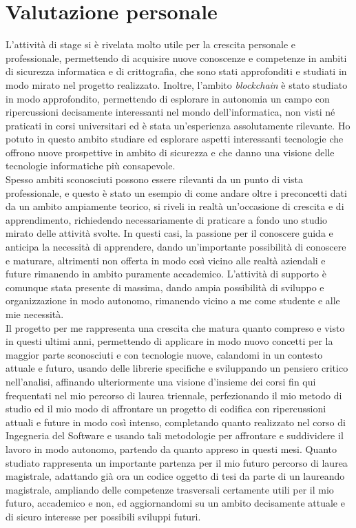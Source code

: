 \section{Valutazione personale}\label{sec:conclusioni-valutazione}

L'attività di stage si è rivelata molto utile per la crescita personale e professionale, permettendo di acquisire nuove conoscenze
e competenze in ambiti di sicurezza informatica e di crittografia, che sono stati approfonditi e studiati in modo mirato nel progetto realizzato.
Inoltre, l'ambito \textit{blockchain} è stato studiato in modo approfondito, permettendo di esplorare in autonomia un campo con ripercussioni
decisamente interessanti nel mondo dell'informatica, non visti né praticati in corsi universitari ed è stata un'esperienza assolutamente rilevante. 
Ho potuto in questo ambito studiare ed esplorare aspetti interessanti tecnologie che offrono nuove prospettive in ambito di sicurezza e che danno una visione delle tecnologie informatiche più consapevole. \\

Spesso ambiti sconosciuti possono essere rilevanti da un punto di vista professionale, e questo è stato un esempio di come
andare oltre i preconcetti dati da un ambito ampiamente teorico, si riveli in realtà un'occasione di crescita
e di apprendimento, richiedendo necessariamente di praticare a fondo uno studio mirato delle attività svolte. 
In questi casi, la passione per il conoscere guida e anticipa la necessità di apprendere, dando un'importante possibilità di conoscere e maturare,
altrimenti non offerta in modo così vicino alle realtà aziendali e future rimanendo in ambito puramente accademico.
L'attività di supporto è comunque stata presente di massima, dando ampia possibilità di sviluppo e organizzazione in modo autonomo, 
rimanendo vicino a me come studente e alle mie necessità. \\

\clearpage
Il progetto per me rappresenta una crescita che matura quanto compreso e visto in questi ultimi anni, permettendo di applicare in modo nuovo 
concetti per la maggior parte sconosciuti e con tecnologie nuove, calandomi in un contesto attuale e futuro, usando delle librerie specifiche e sviluppando un
pensiero critico nell'analisi, affinando ulteriormente una visione d'insieme dei corsi fin qui frequentati nel mio percorso di laurea triennale, perfezionando il mio metodo di studio 
ed il mio modo di affrontare un progetto di codifica con ripercussioni attuali e future in modo così intenso, completando quanto realizzato nel corso di Ingegneria del Software
e usando tali metodologie per affrontare e suddividere il lavoro in modo autonomo, partendo da quanto appreso in questi mesi.
Quanto studiato rappresenta un importante partenza per il mio futuro percorso di laurea magistrale, adattando già ora un codice oggetto di tesi da parte di un laureando magistrale,
ampliando delle competenze trasversali certamente utili per il mio futuro, accademico e non, ed aggiornandomi su un ambito decisamente attuale e di sicuro interesse per possibili sviluppi futuri.